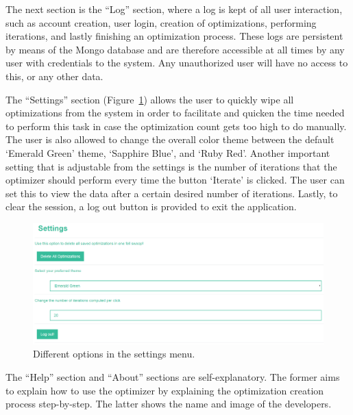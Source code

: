 \documentclass{article}
\begin{document}
The next section is the ``Log'' section, where a log is kept of all user interaction, such as account creation, user login, creation of optimizations, performing iterations, and lastly finishing an optimization process. These logs are persistent by means of the Mongo database and are therefore accessible at all times by any user with credentials to the system. Any unauthorized user will have no access to this, or any other data.


The ``Settings'' section (Figure~\ref{fig:settings_image}) allows the user to quickly wipe all optimizations from the system in order to facilitate and quicken the time needed to perform this task in case the optimization count gets too high to do manually. The user is also allowed to change the overall color theme between the default `Emerald Green' theme, `Sapphire Blue', and `Ruby Red'. Another important setting that is adjustable from the settings is the number of iterations that the optimizer should perform every time the button `Iterate' is clicked. The user can set this to view the data after a certain desired number of iterations. Lastly, to clear the session, a log out button is provided to exit the application. 

\begin{figure}[h!]
  \centering
    \includegraphics[scale=0.3]{images/settings.png}
  \caption{Different options in the settings menu.}
  \label{fig:settings_image}
\end{figure}

The ``Help'' section and ``About'' sections are self-explanatory. The former aims to explain how to use the optimizer by explaining the optimization creation process step-by-step. The latter shows the name and image of the developers.







\end{document}
